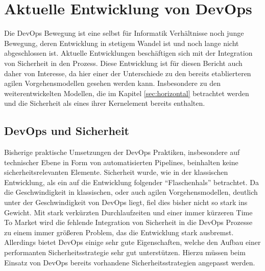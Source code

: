 \section{Aktuelle Entwicklung von DevOps} %
Die DevOps Bewegung ist eine selbst für Informatik Verhältnisse noch junge Bewegung, deren Entwicklung in stetigem Wandel ist und noch lange nicht abgeschlossen ist. 
Aktuelle Entwicklungen beschäftigen sich mit der Integration von Sicherheit in den Prozess. 
Diese Entwicklung ist für diesen Bericht auch daher von Interesse, da hier einer der Unterschiede zu den bereits etablierteren agilen Vorgehensmodellen gesehen werden kann. 
Insbesondere zu den weiterentwickelten Modellen, die im Kapitel \autoref{sec:horizontal} betrachtet werden und die Sicherheit als eines ihrer Kernelement bereits enthalten.

\subsection{DevOps und Sicherheit}
Bisherige praktische Umsetzungen der DevOps Praktiken, insbesondere auf technischer Ebene in Form von automatisierten Pipelines, beinhalten keine sicherheitsrelevanten Elemente. 
Sicherheit wurde, wie in der klassischen Entwicklung, als ein auf die Entwicklung folgender \enquote{Flaschenhals} betrachtet. 
Da die Geschwindigkeit in klassischen, oder auch agilen Vorgehensmodellen, deutlich unter der Geschwindigkeit von DevOps liegt, fiel dies bisher nicht so stark ins Gewicht. 
Mit stark verkürzten Durchlaufzeiten und einer immer kürzeren Time To Market wird die fehlende Integration von Sicherheit in die DevOps Prozesse zu einem immer größeren Problem, das die Entwicklung stark ausbremst. 
Allerdings bietet DevOps einige sehr gute Eigenschaften, welche den Aufbau einer performanten Sicherheitsstrategie sehr gut unterstützen. 
Hierzu müssen beim Einsatz von DevOps bereits vorhandene Sicherheitsstrategien angepasst werden.

